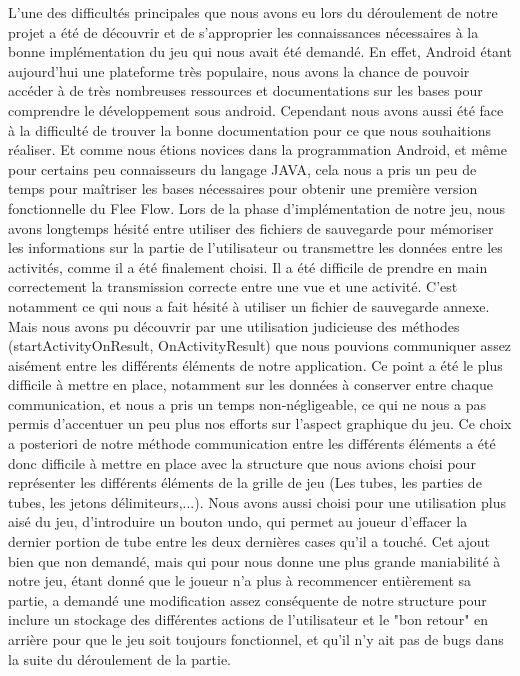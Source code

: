 \documentclass[12pt, a4paper]{article}%
\begin{document}
L'une des difficultés principales que nous avons eu lors du déroulement de notre projet a été de découvrir et de s'approprier les connaissances nécessaires à la bonne implémentation du jeu qui nous avait été demandé. En effet, Android étant aujourd'hui une plateforme très populaire, nous avons la chance de pouvoir accéder à de très nombreuses ressources et documentations sur les bases pour comprendre le développement sous android. Cependant nous avons aussi été face à la difficulté de trouver la bonne documentation pour ce que nous souhaitions réaliser. Et comme nous étions novices dans la programmation Android, et même pour certains peu connaisseurs du langage JAVA, cela nous a pris un peu de temps pour maîtriser les bases nécessaires pour obtenir une première version fonctionnelle du Flee Flow. 
Lors de la phase d'implémentation de notre jeu, nous avons longtemps hésité entre utiliser des fichiers de sauvegarde pour mémoriser les informations sur la partie de l'utilisateur ou transmettre les données entre les activités, comme il a été finalement choisi. Il a été difficile de prendre en main correctement la transmission correcte entre une vue et une activité. C'est notamment ce qui nous a fait hésité à utiliser un fichier de sauvegarde annexe. Mais nous avons pu découvrir par une utilisation judicieuse des méthodes (startActivityOnResult, OnActivityResult) que nous pouvions communiquer assez aisément entre les différents éléments de notre application. Ce point a été le plus difficile à mettre en place, notamment sur les données à conserver entre chaque communication, et nous a pris un temps non-négligeable, ce qui ne nous a pas permis d'accentuer un peu plus nos efforts sur l'aspect graphique du jeu. Ce choix a posteriori de notre méthode communication entre les différents éléments a été donc difficile à mettre en place avec la structure que nous avions choisi pour représenter les différents éléments de la grille de jeu (Les tubes, les parties de tubes, les jetons délimiteurs,...). 
Nous avons aussi choisi pour une utilisation plus aisé du jeu, d'introduire un bouton undo, qui permet au joueur d'effacer la dernier portion de tube entre les deux dernières cases qu'il a touché. Cet ajout bien que non demandé, mais qui pour nous donne une plus grande maniabilité à notre jeu, étant donné que le joueur n'a plus à recommencer entièrement sa partie, a demandé une modification assez conséquente de notre structure pour inclure un stockage des différentes actions de l'utilisateur et le "bon retour" en arrière pour que le jeu soit toujours fonctionnel, et qu'il n'y ait pas de bugs dans la suite du déroulement de la partie.
\end{document}
